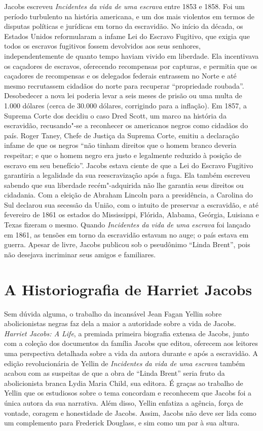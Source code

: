 Jacobs escreveu \emph{Incidentes da vida de uma escrava} entre 1853 e
1858. Foi um período turbulento na história americana, e um dos mais
violentos em termos de disputas políticas e jurídicas
em torno da escravidão. No início da década, os Estados Unidos
reformularam a infame Lei do Escravo Fugitivo, que exigia que todos os
escravos fugitivos fossem devolvidos aos seus senhores,
independentemente de quanto tempo haviam vivido em liberdade. Ela
incentivava os caçadores de escravos, oferecendo recompensas por
capturas, e permitia que os caçadores de recompensas e os delegados
federais entrassem no Norte e até mesmo recrutassem cidadãos do norte
para recuperar ``propriedade roubada''. Desobedecer a nova lei poderia
levar a seis meses de prisão ou uma multa de 1.000 dólares (cerca de
30.000 dólares, corrigindo para a inflação). Em 1857, a Suprema Corte
dos  decidiu o caso Dred Scott, um marco na história da escravidão,
recusando"-se a reconhecer os americanos negros como cidadãos do país.
Roger Taney, Chefe de Justiça da Suprema Corte, emitiu a declaração
infame de que os negros ``não tinham direitos que o homem branco deveria
respeitar; e que o homem negro era justo e legalmente reduzido à posição
de escravo em seu benefício''. Jacobs estava ciente de que a Lei do
Escravo Fugitivo garantiria a legalidade da sua reescravização após a
fuga. Ela também escreveu sabendo que sua liberdade recém"-adquirida não
lhe garantia seus direitos ou cidadania. Com a eleição de Abraham
Lincoln para a presidência, a Carolina do Sul declarou sua secessão da
União, com o intuito de preservar a escravidão, e até fevereiro de 1861
os estados do Mississippi, Flórida, Alabama, Geórgia, Luisiana e Texas
fizeram o mesmo. Quando \emph{Incidentes da vida de uma escrava} foi
lançado em 1861, as tensões em torno da escravidão estavam no auge; o
país estava em guerra. Apesar de livre, Jacobs publicou sob o pseudônimo
``Linda Brent'', pois não desejava incriminar seus amigos e familiares.

\section{A Historiografia de Harriet Jacobs}

Sem dúvida alguma, o trabalho da incansável Jean Fagan Yellin sobre
abolicionistas negras faz dela a maior a autoridade sobre a vida de
Jacobs. \emph{Harriet Jacobs: A Life}, a premiada primeira biografia
extensa de Jacobs, junto com a coleção dos documentos da família Jacobs
que editou, oferecem aos leitores uma perspectiva detalhada sobre a vida
da autora durante e após a escravidão. A edição revolucionária de Yellin
de \emph{Incidentes da vida de uma escrava} também acabou com as
suspeitas de que a obra de ``Linda Brent'' seria fruto da abolicionista
branca Lydia Maria Child, sua editora. É graças ao trabalho de Yellin
que os estudiosos sobre o tema concordam e reconhecem que Jacobs foi a
única autora da sua narrativa. Além disso, Yellin enfatiza a agência,
força de vontade, coragem e honestidade de Jacobs. Assim, Jacobs não
deve ser lida como um complemento para Frederick Douglass, e sim como um
par à sua altura.

